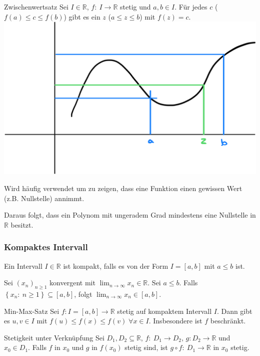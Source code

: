 \documentclass[a4paper,10pt]{article}
\def\limn{\lim_{n\to \infty}}
\def\R{\mathbb{R}}
\begin{document}
\begin{mainbox}{Zwischenwertsatz}
 Sei $I \in \R$, $f: \: I \to \R$ stetig und $a, b \in I$. Für jedes $c$ ($f(a) \leq c \leq f(b)$) gibt es ein $z$ ($a \leq z \leq b$) mit $f(z) = c$.
 \includegraphics[width=\linewidth]{Zwischenwertsatz.png}
\end{mainbox}
Wird häufig verwendet um zu zeigen, dass eine Funktion einen gewissen Wert (z.B. Nullstelle) annimmt.

Daraus folgt, dass ein Polynom mit ungeradem Grad mindestens eine Nullstelle in $\R$ besitzt.

\subsubsection{Kompaktes Intervall}
Ein Intervall $I \in \R$ ist kompakt, falls es von der Form $I = [a,b]$ mit $a \le b$ ist.

\begin{subbox}{}
Sei $(x_n)_{n \geq 1}$ konvergent mit $\limn{x_n} \in \R$. Sei $a \leq b$. Falls $\left\{ x_n: \: n \geq 1 \right\} \subseteq \left[ a, b \right]$, folgt $\limn{x_n} \in \left[ a, b \right]$.
\end{subbox}

\begin{mainbox}{Min-Max-Satz}
 Sei $f: I = [a,b] \to \R$ stetig auf kompaktem Intervall $I$. Dann gibt es $u, v \in I$ mit $f(u) \le f(x) \le f(v) \; \forall x \in I$. Insbesondere ist $f$ beschränkt.
\end{mainbox}

\begin{subbox}{Stetigkeit unter Verknüpfung}
 Sei $D_1, D_2 \subseteq \R$, $f: \: D_1 \to D_2, \, g: D_2 \to \R$ und $x_0 \in D_1$. Falls $f$ in $x_0$ und $g$ in $f(x_0)$ stetig sind, ist $g \circ f: \: D_1 \to \R$ in $x_0$ stetig.
\end{subbox}
\end{document}
